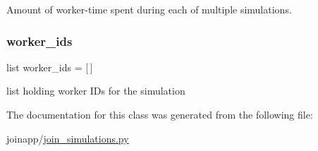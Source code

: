 Amount of worker-\/time spent during each of multiple simulations. 

\mbox{\label{classjoinapp_1_1join__simulations_1_1_join_simulation_a231d4f3b3122b16491ad49b8809cab66}} 
\subsubsection{\texorpdfstring{worker\_ids}{worker\_ids}}
{\footnotesize\ttfamily list worker\+\_\+ids = \mbox{[}$\,$\mbox{]}\hspace{0.3cm}{\ttfamily [static]}}



list holding worker I\+Ds for the simulation 



The documentation for this class was generated from the following file\+:\begin{DoxyCompactItemize}
\item 
joinapp/\mbox{\hyperlink{join__simulations_8py}{join\+\_\+simulations.\+py}}\end{DoxyCompactItemize}
